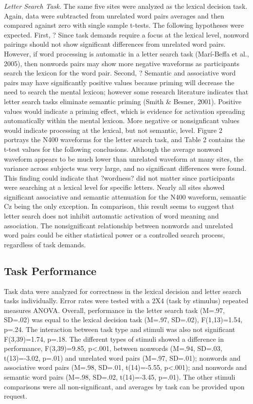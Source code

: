 \documentclass[english,man]{apa6}
\theoremstyle{definition}
\theoremstyle{definition}
\theoremstyle{definition}
\theoremstyle{remark}
\begin{document}
\emph{Letter Search Task}. The same five sites were analyzed as the
lexical decision task. Again, data were subtracted from unrelated word
pairs averages and then compared against zero with single sample
t-tests. The following hypotheses were expected. First, ? Since task
demands require a focus at the lexical level, nonword pairings should
not show significant differences from unrelated word pairs. However, if
word processing is automatic in a letter search task (Marí-Beffa et al.,
2005), then nonwords pairs may show more negative waveforms as
participants search the lexicon for the word pair. Second, ? Semantic
and associative word pairs may have significantly positive values
because priming will decrease the need to search the mental lexicon;
however some research literature indicates that letter search tasks
eliminate semantic priming (Smith \& Besner, 2001). Positive values
would indicate a priming effect, which is evidence for activation
spreading automatically within the mental lexicon. More negative or
nonsignficant values would indicate processing at the lexical, but not
semantic, level. Figure 2 portrays the N400 waveforms for the letter
search task, and Table 2 contains the t-test values for the following
conclusions. Although the average nonword waveform appears to be much
lower than unrelated waveform at many sites, the variance across
subjects was very large, and no significant differences were found. This
finding could indicate that ?wordness? did not matter since participants
were searching at a lexical level for specific letters. Nearly all sites
showed significant associative and semantic attenuation for the N400
waveform, semantic Cz being the only exception. In comparison, this
result seems to suggest that letter search does not inhibit automatic
activation of word meaning and association. The nonsignificant
relationship between nonwords and unrelated word pairs could be either
statistical power or a controlled search process, regardless of task
demands.

\subsection{Task Performance}\label{task-performance}

Task data were analyzed for correctness in the lexical decision and
letter search tasks individually. Error rates were tested with a 2X4
(task by stimulus) repeated measures ANOVA. Overall, performance in the
letter search task (M=.97, SD=.02) was equal to the lexical decision
task (M=.97, SD=.02), F(1,13)=1.54, p=.24. The interaction between task
type and stimuli was also not significant F(3,39)=1.74, p=.18. The
different types of stimuli showed a difference in performance,
F(3,39)=9.85, p\textless{}.001, between nonwords (M=.94, SD=.03,
t(13)=-3.02, p=.01) and unrelated word pairs (M=.97, SD=.01); nonwords
and associative word pairs (M=.98, SD=.01, t(14)=-5.55,
p\textless{}.001); and nonwords and semantic word pairs (M=.98, SD=.02,
t(14)=-3.45, p=.01). The other stimuli comparisons were all
non-significant, and averages by task can be provided upon request.
\end{document}
